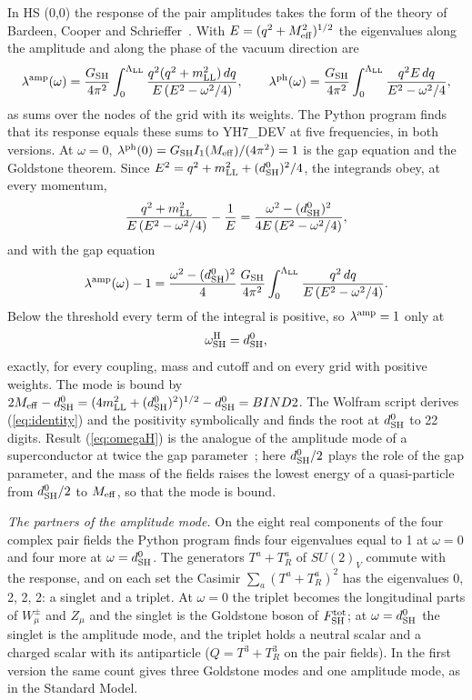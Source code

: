 \documentclass[aps,prd,onecolumn,superscriptaddress,nofootinbib,floatfix,longbibliography]{revtex4-2}
\newcommand{\LL}{{\rm LL}}
\newcommand{\SH}{{\rm SH}}
\begin{document}
In HS (0,0) the response of the pair amplitudes takes the form of the theory of Bardeen, Cooper and
Schrieffer~\cite{BCS1957}. With $E=(q^2+M_{\rm eff}^2)^{1/2}$ the eigenvalues along the amplitude and along the phase of the
vacuum direction are
\begin{equation}
\lambda^{\rm amp}(\omega)=\frac{G_\SH}{4\pi^2}\int_0^{\Lambda_\LL}\frac{q^2(q^2+m_\LL^2)\,dq}{E\,(E^2-\omega^2/4)},\qquad
\lambda^{\rm ph}(\omega)=\frac{G_\SH}{4\pi^2}\int_0^{\Lambda_\LL}\frac{q^2E\,dq}{E^2-\omega^2/4},
\label{eq:lam}
\end{equation}
as sums over the nodes of the grid with its weights. The Python program finds that its response equals these sums to
{{YH7_DEV}} at five frequencies, in both versions. At $\omega=0$, $\lambda^{\rm ph}(0)=G_\SH I_1(M_{\rm eff})/(4\pi^2)=1$ is the
gap equation and the Goldstone theorem. Since $E^2=q^2+m_\LL^2+(d^0_\SH)^2/4$, the integrands obey, at every momentum,
\begin{equation}
\frac{q^2+m_\LL^2}{E\,(E^2-\omega^2/4)}-\frac1E=\frac{\omega^2-(d^0_\SH)^2}{4E\,(E^2-\omega^2/4)},
\end{equation}
and with the gap equation
\begin{equation}
\lambda^{\rm amp}(\omega)-1=\frac{\omega^2-(d^0_\SH)^2}{4}\,\frac{G_\SH}{4\pi^2}\int_0^{\Lambda_\LL}\frac{q^2\,dq}{E\,(E^2-\omega^2/4)} .
\label{eq:identity}
\end{equation}
Below the threshold every term of the integral is positive, so $\lambda^{\rm amp}=1$ only at
\begin{equation}
\omega^{\rm H}_\SH=d^0_\SH ,
\label{eq:omegaH}
\end{equation}
exactly, for every coupling, mass and cutoff and on every grid with positive weights. The mode is bound by
$2M_{\rm eff}-d^0_\SH=(4m_\LL^2+(d^0_\SH)^2)^{1/2}-d^0_\SH={{BIND2}}$. The Wolfram script derives (\ref{eq:identity}) and the
positivity symbolically and finds the root at $d^0_\SH$ to 22 digits. Result (\ref{eq:omegaH}) is the analogue of the
amplitude mode of a superconductor at twice the gap parameter~\cite{LittlewoodVarma1981,PekkerVarma2015}; here $d^0_\SH/2$
plays the role of the gap parameter, and the mass of the fields raises the lowest energy of a quasi-particle from
$d^0_\SH/2$ to $M_{\rm eff}$, so that the mode is bound.

\emph{The partners of the amplitude mode.} On the eight real components of the four complex pair fields the Python
program finds four eigenvalues equal to 1 at $\omega=0$ and four more at $\omega=d^0_\SH$. The generators $T^a+T^a_R$ of
$SU(2)_V$ commute with the response, and on each set the Casimir $\sum_a(T^a+T^a_R)^2$ has the eigenvalues 0, 2, 2, 2: a
singlet and a triplet. At $\omega=0$ the triplet becomes the longitudinal parts of $W^\pm_\mu$ and $Z_\mu$ and the singlet is
the Goldstone boson of $F^{\rm tot}_\SH$; at $\omega=d^0_\SH$ the singlet is the amplitude mode, and the triplet holds a
neutral scalar and a charged scalar with its antiparticle ($Q=T^3+T^3_R$ on the pair fields). In the first version the
same count gives three Goldstone modes and one amplitude mode, as in the Standard Model.
\end{document}
